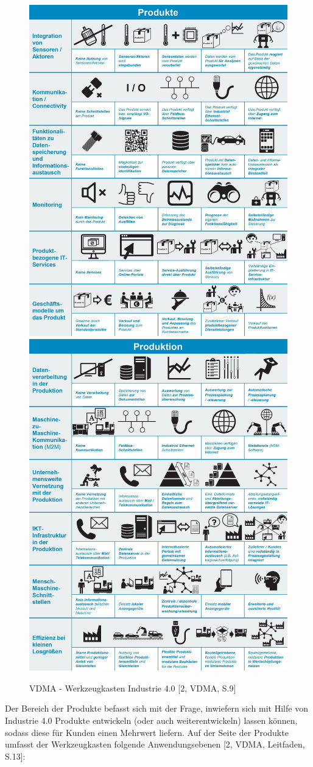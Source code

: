 \begin{figure}[h]
	\includegraphics[width=0.5\linewidth]{Bilder/A6_VDMAWerkzeugkasten1}
	\includegraphics[width=0.5\linewidth]{Bilder/A7_VDMAWerkzeugkasten2}
	\caption{VDMA - Werkzeugkasten Industrie 4.0 [2, VDMA, S.9]}
	\label{fig:VDMAWerkzeugkasten}
\end{figure}
\newline
\noindent Der Bereich der Produkte befasst sich mit der Frage, inwiefern sich mit Hilfe von Industrie 4.0 Produkte entwickeln (oder auch weiterentwickeln) lassen können, sodass diese für Kunden einen Mehrwert liefern. Auf der Seite der Produkte umfasst der Werkzeugkasten folgende Anwendungsebenen [2, VDMA, Leitfaden, S.13]:

